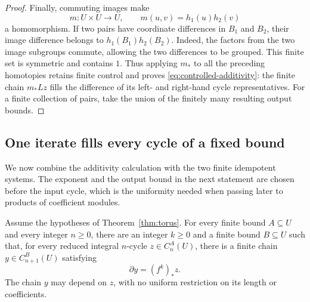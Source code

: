 \begin{proof}
Finally, commuting images make
\[
 m:U\times U\longrightarrow U,
       \qquad m(u,v)=h_1(u)h_2(v)
\]
a homomorphism.  If two pairs have coordinate differences in
$B_1$ and $B_2$, their image difference belongs to
$h_1(B_1)h_2(B_2)$.  Indeed, the factors from the two image subgroups
commute, allowing the two differences to be grouped.  This finite
set is symmetric and contains $1$.  Thus applying $m_*$ to all the
preceding homotopies retains finite control and proves
\eqref{eq:controlled-additivity}: the finite chain $m_*Lz$ fills
the difference of its left- and right-hand cycle representatives.
For a finite collection of pairs,
take the union of the finitely many resulting output bounds.
\end{proof}

\subsection{One iterate fills every cycle of a fixed bound}

We now combine the additivity calculation with the two finite
idempotent systems.  The exponent and the output bound in the next
statement are chosen before the input cycle, which is the uniformity
needed when passing later to products of coefficient modules.

\begin{proposition}\label{prop:uniform-fillings}
Assume the hypotheses of Theorem~\ref{thm:torus}.  For every finite
bound $A\subseteq U$ and every integer $n\ge0$, there are an integer
$k\ge0$ and a finite bound $B\subseteq U$ such that, for every
reduced integral $n$-cycle $z\in C_n^A(U)$, there is a finite chain
$y\in C_{n+1}^B(U)$ satisfying
\[
 \partial y=(f^k)_*z.
\]
The chain $y$ may depend on $z$, with no uniform restriction on its
length or coefficients.
\end{proposition}

